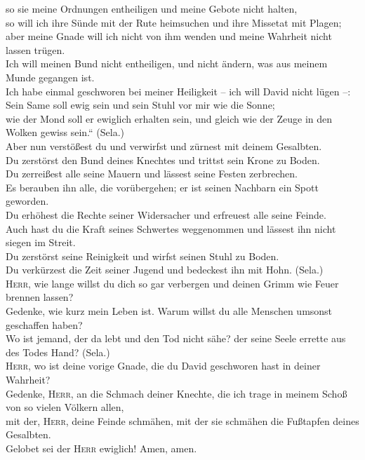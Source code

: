  so sie meine Ordnungen entheiligen und meine Gebote
nicht halten,\\
 so will ich ihre Sünde mit der Rute heimsuchen und ihre
Missetat mit Plagen;\\
 aber meine Gnade will ich nicht von ihm wenden und meine
Wahrheit nicht lassen trügen.\\
 Ich will meinen Bund nicht entheiligen, und nicht
ändern, was aus meinem Munde gegangen ist.\\
 Ich habe einmal geschworen bei meiner Heiligkeit -- ich
will David nicht lügen --:\\
 Sein Same soll ewig sein und sein Stuhl vor mir wie die
Sonne;\\
 wie der Mond soll er ewiglich erhalten sein, und gleich
wie der Zeuge in den Wolken gewiss sein.`` (Sela.)\\
 Aber nun verstößest du und verwirfst und zürnest mit
deinem Gesalbten.\\
 Du zerstörst den Bund deines Knechtes und trittst sein
Krone zu Boden.\\
 Du zerreißest alle seine Mauern und lässest seine Festen
zerbrechen.\\
 Es berauben ihn alle, die vorübergehen; er ist seinen
Nachbarn ein Spott geworden.\\
 Du erhöhest die Rechte seiner Widersacher und erfreuest
alle seine Feinde.\\
 Auch hast du die Kraft seines Schwertes weggenommen und
lässest ihn nicht siegen im Streit.\\
 Du zerstörst seine Reinigkeit und wirfst seinen Stuhl zu
Boden.\\
 Du verkürzest die Zeit seiner Jugend und bedeckest ihn
mit Hohn. (Sela.)\\
 \textsc{Herr}, wie lange willst du dich so gar verbergen
und deinen Grimm wie Feuer brennen lassen?\\
 Gedenke, wie kurz mein Leben ist. Warum willst du alle
Menschen umsonst geschaffen haben?\\
 Wo ist jemand, der da lebt und den Tod nicht sähe? der
seine Seele errette aus des Todes Hand? (Sela.)\\
 \textsc{Herr}, wo ist deine vorige Gnade, die du David
geschworen hast in deiner Wahrheit?\\
 Gedenke, \textsc{Herr}, an die Schmach deiner Knechte,
die ich trage in meinem Schoß von so vielen Völkern allen,\\
 mit der, \textsc{Herr}, deine Feinde schmähen, mit der
sie schmähen die Fußtapfen deines Gesalbten.\\
 Gelobet sei der \textsc{Herr} ewiglich! Amen, amen.

